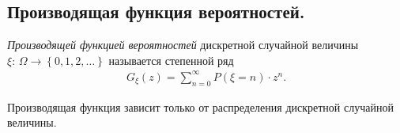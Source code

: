 \documentclass[../main.tex]{subfiles}
\begin{document}
\subsection{Производящая функция вероятностей.}

\begin{df}
 \textit{Производящей функцией вероятностей} дискретной случайной величины $ \xi\colon\,\Omega\to \left\{ 0,1,2,\ldots \right\} $ называется степенной ряд
 \begin{align*}
  G_\xi(z) = \sum_{n=0}^{\infty}P(\xi = n) \cdot z^{n}.
 \end{align*}
\end{df}

\begin{remrk*}
 Производящая функция зависит только от распределения дискретной случайной величины. 
\end{remrk*}
\end{document}
